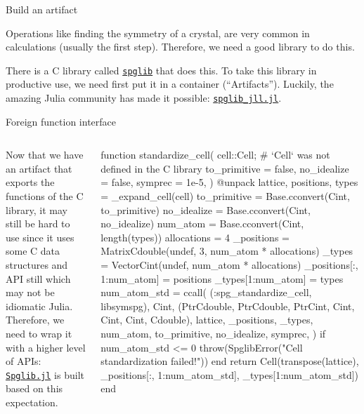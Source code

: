 \begin{frame}{Build an artifact}

    Operations like finding the symmetry of a crystal,
    are very common in \ab{} calculations (usually the first step).
    Therefore, we need a good library to do this.

    There is a C library called \href{https://github.com/spglib/spglib}{\texttt{spglib}}
    that does this.
    To take this library in productive use, we need first put it in a container
    (``Artifacts''). Luckily, the amazing Julia community has made it possible:
    \href{https://github.com/JuliaBinaryWrappers/spglib_jll.jl}{\texttt{spglib_jll.jl}}.

\end{frame}

\begin{frame}[fragile]{Foreign function interface}

    \begin{columns}
        \begin{column}{0.3\textwidth}
            Now that we have an artifact that exports the functions of the C library,
            it may still be hard to use since it uses some C data structures and API still which may
            not be idiomatic Julia. Therefore, we need to wrap it with a higher level of APIs:
            \href{https://github.com/singularitti/Spglib.jl}{\texttt{Spglib.jl}} is built based on
            this expectation.
        \end{column}

        \begin{column}{0.7\textwidth}
            {\tiny
                \begin{algorithmblock}
                    \begin{juliaverbatim}
function standardize_cell(
    cell::Cell;  # `Cell` was not defined in the C library
    to_primitive = false,
    no_idealize = false,
    symprec = 1e-5,
)
    @unpack lattice, positions, types = _expand_cell(cell)
    to_primitive = Base.cconvert(Cint, to_primitive)
    no_idealize = Base.cconvert(Cint, no_idealize)
    num_atom = Base.cconvert(Cint, length(types))
    allocations = 4
    _positions = Matrix{Cdouble}(undef, 3, num_atom * allocations)
    _types = Vector{Cint}(undef, num_atom * allocations)
    _positions[:, 1:num_atom] = positions
    _types[1:num_atom] = types
    num_atom_std = ccall(
        (:spg_standardize_cell, libsymspg),
        Cint,
        (Ptr{Cdouble}, Ptr{Cdouble}, Ptr{Cint}, Cint, Cint, Cint, Cdouble),
        lattice,
        _positions,
        _types,
        num_atom,
        to_primitive,
        no_idealize,
        symprec,
    )
    if num_atom_std <= 0
        throw(SpglibError("Cell standardization failed!"))
    end
    return Cell(transpose(lattice), _positions[:, 1:num_atom_std], _types[1:num_atom_std])
end
                    \end{juliaverbatim}
                \end{algorithmblock}
            }
        \end{column}
    \end{columns}

\end{frame}

